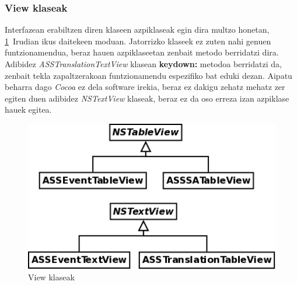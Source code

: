\subsubsection{View klaseak}
Interfazean erabiltzen diren klaseen azpiklaseak egin dira multzo honetan, \ref{kd-view}~Irudian ikus daitekeen moduan. Jatorrizko klaseek ez zuten nahi genuen funtzionamendua, beraz hauen azpiklaseetan zenbait metodo berridatzi dira. Adibidez \textit{ASSTranslationTextView} klasean \textbf{keydown:} metodoa berridatzi da, zenbait tekla zapaltzerakoan funtzionamendu espezifiko bat eduki dezan. Aipatu beharra dago \textit{Cocoa} ez dela software irekia, beraz ez dakigu zehatz mehatz zer egiten duen adibidez \textit{NSTextView} klaseak, beraz ez da oso erreza izan azpiklase hauek egitea.
\begin{figure}[htp]
\begin{center}
\includegraphics[scale=0.4]{Pictures/Chapter4/Diseinua/KD-View.png}
\caption{View klaseak}
\label{kd-view}
\end{center}
\end{figure}

